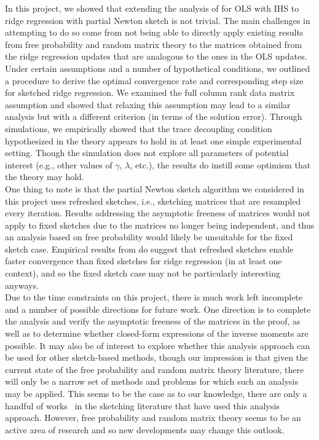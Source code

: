 In this project, we showed that extending the analysis of \citet{Lacotte:2020} for OLS with IHS to ridge regression with partial Newton sketch is not trivial. The main challenges in attempting to do so come from not being able to directly apply existing results from free probability and random matrix theory to the matrices obtained from the ridge regression updates that are analogous to the ones in the OLS updates. Under certain assumptions and a number of hypothetical conditions, we outlined a procedure to derive the optimal convergence rate and corresponding step size for sketched ridge regression. We examined the full column rank data matrix assumption and showed that relaxing this assumption may lead to a similar analysis but with a different criterion (in terms of the solution error). Through simulations, we empirically showed that the trace decoupling condition hypothesized in the theory appears to hold in at least one simple experimental setting. Though the simulation does not explore all parameters of potential interest (e.g., other values of $\gamma$, $\lambda$, etc.), the results do instill some optimism that the theory may hold.
\\

One thing to note is that the partial Newton sketch algorithm we considered in this project uses refreshed sketches, i.e., sketching matrices that are resampled every iteration. Results addressing the asymptotic freeness of matrices would not apply to fixed sketches due to the matrices no longer being independent, and thus an analysis based on free probability would likely be unsuitable for the fixed sketch case. Empirical results from \citet{Chowdhury:2018} do suggest that refreshed sketches enable faster convergence than fixed sketches for ridge regression (in at least one context), and so the fixed sketch case may not be particularly interesting anyways.
\\

Due to the time constraints on this project, there is much work left incomplete and a number of possible directions for future work. One direction is to complete the analysis and verify the asymptotic freeness of the matrices in the proof, as well as to determine whether closed-form expressions of the inverse moments are possible. It may also be of interest to explore whether this analysis approach can be used for other sketch-based methods, though our impression is that given the current state of the free probability and random matrix theory literature, there will only be a narrow set of methods and problems for which such an analysis may be applied. This seems to be the case as to our knowledge, there are only a handful of works~\citep{Dobriban:2019,Lacotte:2020,Lacotte:2020b} in the sketching literature that have used this analysis approach. However, free probability and random matrix theory seems to be an active area of research and so new developments may change this outlook.
